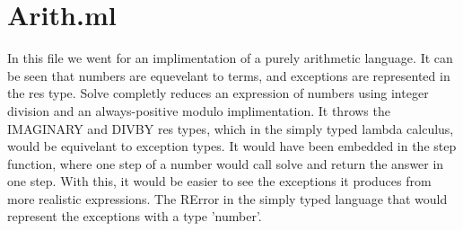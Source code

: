 \documentclass{article}
\begin{document}
\section*{Arith.ml}
In this file we went for an implimentation of a purely arithmetic language. It can be seen that numbers are equevelant to terms, and exceptions are represented in the res type. Solve completly reduces an expression of numbers using integer division and an always-positive modulo implimentation. It throws the IMAGINARY and DIV\textunderscore BY res types, which in the simply typed lambda calculus, would be equivelant to exception types. It would have been embedded in the step function, where one step of a number would call solve and return the answer in one step. With this, it would be easier to see the exceptions it produces from more realistic expressions. The RError in the simply typed language that would represent the exceptions with a type 'number'.  
\end{document}
